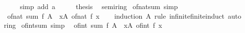 \begin{isabellebody}
\ \ \ \ \isamarkupfalse%
\ {\isacharparenleft}{\kern0pt}simp\ add{\isacharcolon}{\kern0pt}\ a{\isacharparenright}{\kern0pt}\isanewline
\ \ \isamarkupfalse%
\ \isamarkupfalse%
\ {\isacharquery}{\kern0pt}thesis\ \isacommand{{\isachardot}{\kern0pt}}\isamarkupfalse%
\isanewline
{}\isamarkupfalse%
%
\endisatagproof
{\isafoldproof}%
%
\isadelimproof
%
\endisadelimproof
%
\isadelimdocument
%
\endisadelimdocument
%
\isatagdocument
%
\isamarkuptrue%
%
\endisatagdocument
{\isafolddocument}%
%
\isadelimdocument
%
\endisadelimdocument
{}\isamarkupfalse%
\ semiring{\isacharunderscore}{\kern0pt}{}\isanewline
{}\isanewline
\isanewline
{}\isamarkupfalse%
\ of{\isacharunderscore}{\kern0pt}nat{\isacharunderscore}{\kern0pt}sum\ {\isacharbrackleft}{\kern0pt}simp{\isacharbrackright}{\kern0pt}{\isacharcolon}{\kern0pt}\isanewline
\ \ {\isachardoublequoteopen}of{\isacharunderscore}{\kern0pt}nat\ {\isacharparenleft}{\kern0pt}sum\ f\ A{\isacharparenright}{\kern0pt}\ {\isacharequal}{\kern0pt}\ {\isacharparenleft}{\kern0pt}{\isasymSum}x{\isasymin}A{\isachardot}{\kern0pt}\ of{\isacharunderscore}{\kern0pt}nat\ {\isacharparenleft}{\kern0pt}f\ x{\isacharparenright}{\kern0pt}{\isacharparenright}{\kern0pt}{\isachardoublequoteclose}\isanewline
%
\isadelimproof
\ \ %
\endisadelimproof
%
\isatagproof
{}\isamarkupfalse%
\ {\isacharparenleft}{\kern0pt}induction\ A\ rule{\isacharcolon}{\kern0pt}\ infinite{\isacharunderscore}{\kern0pt}finite{\isacharunderscore}{\kern0pt}induct{\isacharparenright}{\kern0pt}\ auto%
\endisatagproof
{\isafoldproof}%
%
\isadelimproof
\isanewline
%
\endisadelimproof
\isanewline
{}\isamarkupfalse%
\isanewline
\isanewline
{}\isamarkupfalse%
\ ring{\isacharunderscore}{\kern0pt}{}\isanewline
{}\isanewline
\isanewline
{}\isamarkupfalse%
\ of{\isacharunderscore}{\kern0pt}int{\isacharunderscore}{\kern0pt}sum\ {\isacharbrackleft}{\kern0pt}simp{\isacharbrackright}{\kern0pt}{\isacharcolon}{\kern0pt}\isanewline
\ \ {\isachardoublequoteopen}of{\isacharunderscore}{\kern0pt}int\ {\isacharparenleft}{\kern0pt}sum\ f\ A{\isacharparenright}{\kern0pt}\ {\isacharequal}{\kern0pt}\ {\isacharparenleft}{\kern0pt}{\isasymSum}x{\isasymin}A{\isachardot}{\kern0pt}\ of{\isacharunderscore}{\kern0pt}int\ {\isacharparenleft}{\kern0pt}f\ x{\isacharparenright}{\kern0pt}{\isacharparenright}{\kern0pt}{\isachardoublequoteclose}\isanewline
%
\isadelimproof

\end{isabellebody}
